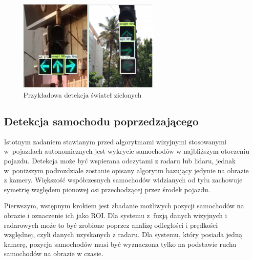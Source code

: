 \begin{figure}
  \centering
  \includegraphics[width=7cm]{img/traffic_light3_results.png}
  \caption{Przykładowa detekcja świateł zielonych\cite{T10}}
  \label{fig:traffic_light3_results}
\end{figure}





\subsection{Detekcja samochodu poprzedzającego}
\label{sec:car_general}

Istotnym zadaniem stawianym przed algorytmami wizyjnymi stosowanymi w~pojazdach autonomicznych jest wykrycie samochodów w najbliższym otoczeniu pojazdu. 
Detekcja może być wspierana odczytami z radaru lub lidaru, jednak w~poniższym podrozdziale zostanie opisany algorytm bazujący jedynie na obrazie z kamery. %
Większość współczesnych samochodów widzianych od tyłu zachowuje symetrię względem pionowej osi przechodzącej przez środek pojazdu. 

Pierwszym, wstępnym krokiem jest zbadanie możliwych pozycji samochodów na obrazie i oznaczenie ich jako ROI.
Dla systemu z~fuzją danych wizyjnych i radarowych może to być zrobione poprzez analizę odległości i prędkości względnej, czyli danych uzyskanych z radaru. 
Dla systemu, który posiada jedną kamerę, pozycja samochodów musi być wyznaczona tylko na podstawie ruchu samochodów na obrazie w czasie.

